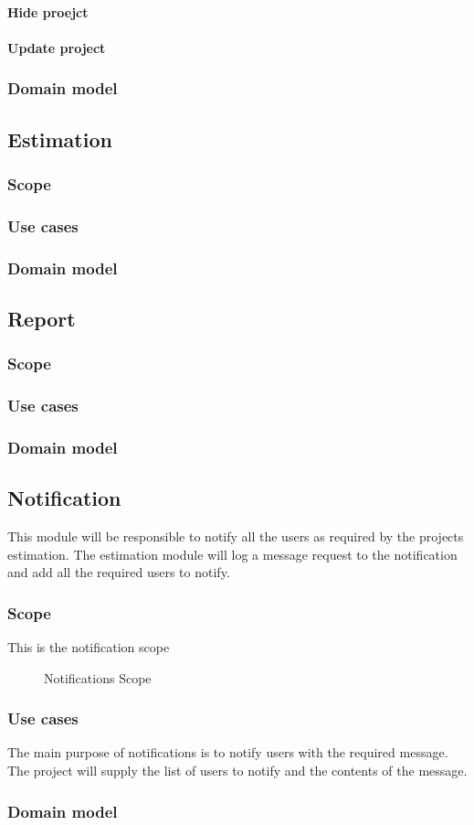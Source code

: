 \paragraph{Hide proejct}
\paragraph{Update project}
\subsubsection{Domain model}
\subsection{Estimation}
\subsubsection{Scope}
\subsubsection{Use cases}
\subsubsection{Domain model}
\subsection{Report}
\subsubsection{Scope}
\subsubsection{Use cases}
\subsubsection{Domain model}
\subsection{Notification}
This module will be responsible to notify all the users as required by the projects estimation. The estimation module will log a message request to the notification and add all the required users to notify.
\subsubsection{Scope}
This is the notification scope
	\begin{figure}[H]
	    	\centering
	    	\caption{Notifications Scope}
	    	\label{fig:Notification_Scope}
   	\end{figure}
\subsubsection{Use cases}
The main purpose of notifications is to notify users with the required message. The project will supply the list of users to notify and the contents of the message.
\subsubsection{Domain model}
